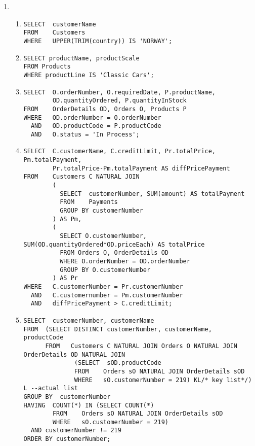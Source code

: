 \begin{enumerate}
\begin{enumerate}[a)]
  \end{enumerate}

  \newpage
  \item\quad\\
  \begin{enumerate}[1.]
    
    \item
\begin{verbatim}
SELECT  customerName
FROM    Customers
WHERE   UPPER(TRIM(country)) IS 'NORWAY';
\end{verbatim}

    \item
\begin{verbatim}
SELECT productName, productScale
FROM Products
WHERE productLine IS 'Classic Cars';
\end{verbatim}

    \item
\begin{verbatim}
SELECT  O.orderNumber, O.requiredDate, P.productName,
		OD.quantityOrdered, P.quantityInStock
FROM    OrderDetails OD, Orders O, Products P
WHERE   OD.orderNumber = O.orderNumber
  AND   OD.productCode = P.productCode
  AND   O.status = 'In Process';
\end{verbatim}

    \item
\begin{verbatim}
SELECT  C.customerName, C.creditLimit, Pr.totalPrice, Pm.totalPayment,
		Pr.totalPrice-Pm.totalPayment AS diffPricePayment
FROM    Customers C NATURAL JOIN
        ( 
          SELECT  customerNumber, SUM(amount) AS totalPayment
          FROM    Payments
          GROUP BY customerNumber
        ) AS Pm,
        (
          SELECT O.customerNumber, SUM(OD.quantityOrdered*OD.priceEach) AS totalPrice
          FROM Orders O, OrderDetails OD
          WHERE O.orderNumber = OD.orderNumber
          GROUP BY O.customerNumber
        ) AS Pr
WHERE   C.customerNumber = Pr.customerNumber
  AND   C.customernumber = Pm.customerNumber
  AND   diffPricePayment > C.creditLimit;
\end{verbatim}

    \item
\begin{verbatim}
SELECT  customerNumber, customerName
FROM  (SELECT DISTINCT customerNumber, customerName, productCode
      FROM   Customers C NATURAL JOIN Orders O NATURAL JOIN OrderDetails OD NATURAL JOIN
              (SELECT  sOD.productCode
              FROM    Orders sO NATURAL JOIN OrderDetails sOD
              WHERE   sO.customerNumber = 219) KL/* key list*/) L --actual list
GROUP BY  customerNumber
HAVING  COUNT(*) IN (SELECT COUNT(*)
        FROM    Orders sO NATURAL JOIN OrderDetails sOD
        WHERE   sO.customerNumber = 219)
  AND customerNumber != 219
ORDER BY customerNumber;
\end{verbatim}
  \end{enumerate}

\end{enumerate}

